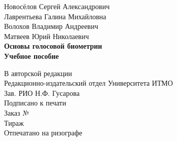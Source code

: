 \documentclass[12pt]{book}
\begin{document}
\begin{center}

\thispagestyle{empty}

\vspace*{80mm}
\large{Новосёлов Сергей Александрович}      \\
\large{Лаврентьева Галина Михайловна}       \\
\large{Волохов Владимир Андреевич}          \\
\large{Матвеев Юрий Николаевич}             \\ [3ex]

\textbf{\Large{Основы голосовой биометрии}} \\ [3ex]

\textbf{\large{Учебное пособие}}

\end{center}

\vspace{70mm}

\begin{flushleft}

\noindent\large{В авторской редакции \\
Редакционно-издательский отдел Университета ИТМО \\
Зав. РИО \hspace{95mm} Н.Ф. Гусарова \\
Подписано к печати \\
Заказ № \\
Тираж \\
Отпечатано на ризографе}

\end{flushleft}
\end{document}
